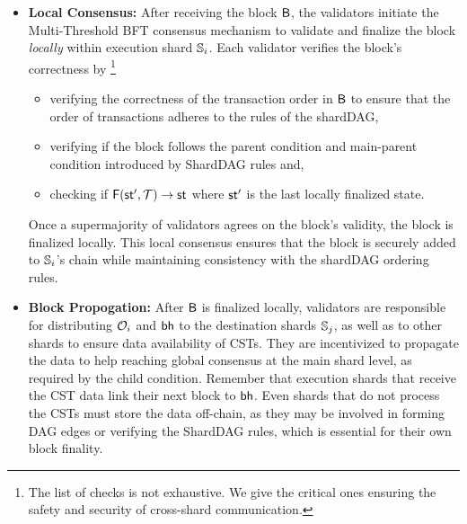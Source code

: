 \begin{itemize}
	\item \textbf{Local Consensus:} After receiving the block $ \mathsf{B}
	      $, the validators initiate the Multi-Threshold BFT
	      consensus mechanism \cite{MultiThresholdBFT} to validate and
	      finalize the
	      block \emph{locally} within execution shard $ \mathbb{S}_i $.
	      Each validator
	      verifies the block’s correctness by \footnote{The list of
		      checks is not
		      exhaustive. We give the critical ones ensuring the
		      safety and security of
		      cross-shard communication.}
	      \begin{itemize}
		      \item verifying  the correctness of the transaction
		            order
		            in $\mathsf{B}$ to ensure that the order of
		            transactions adheres to the rules
		            of the shardDAG,
		      \item verifying if the block follows the parent
		            condition
		            and main-parent condition introduced by
		            ShardDAG rules and,
		      \item checking if $\mathsf{F}(\mathsf{st}', {\mathcal{T}}) \rightarrow
			            \mathsf{st} $
		            where $\mathsf{st}'$ is the last locally finalized
		            state.
	      \end{itemize}
	      Once a supermajority of validators  agrees on the
	      block's validity, the block is finalized locally.
	      This local consensus ensures that the block is securely
	      added to
	      $\mathbb{S}_i $'s chain while maintaining consistency with the
	      shardDAG
	      ordering rules.
	\item \textbf{Block Propogation:} After $\mathsf{B}$ is finalized
	      locally, validators are responsible for distributing $
		      \mathcal{O}_i $ and $ \mathsf{bh} $ to the destination shards
	      $ \mathbb{S}_j $, as well
	      as to other shards to ensure data availability of CSTs. They
	      are
	      incentivized to propagate the data to help reaching global
	      consensus at
	      the main shard level, as required by the child condition.
	      Remember that execution shards that receive the CST data
	      link
	      their next block to $ \mathsf{bh} $. Even shards that do not
	      process the CSTs
	      must store the data off-chain, as they may be involved in
	      forming DAG
	      edges or verifying the ShardDAG rules, which is essential
	      for their own
	      block finality.

\end{itemize}

